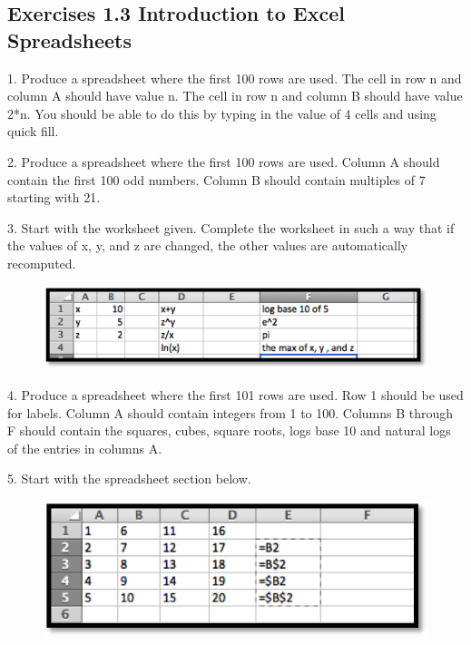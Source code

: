 \documentclass[10pt,]{book}
\theoremstyle{plain}
\theoremstyle{definition}
\theoremstyle{definition}
\begin{document}
\subsection[{Exercises 1.3 Introduction to Excel Spreadsheets}]{Exercises 1.3 Introduction to Excel Spreadsheets}\label{exercises-set-sec-1-3}
\begin{exerciselist}
\item[1.]\hypertarget{exercise-42}{}  Produce a spreadsheet where the first 100 rows are used.  The cell in row n and column A should have value n.  The cell in row n and column B should have value 2*n.  You should be able to do this by typing in the value of 4 cells and using quick fill.
%
\par\smallskip
\item[2.]\hypertarget{exercise-43}{}  Produce a spreadsheet where the first 100 rows are used.  Column A should contain the first 100 odd numbers.  Column B should contain multiples of 7 starting with 21.
%
\par\smallskip
\item[3.]\hypertarget{exercise-44}{}  Start with the worksheet given.  Complete the worksheet in such a way that if the values of x, y, and z are changed, the other values are automatically recomputed.
%
\par\smallskip
\leavevmode%
\begin{figure}
\centering
\includegraphics[width=0.7\linewidth]{images/sec1-3-e1.png}
\end{figure}
\item[4.]\hypertarget{exercise-45}{}  Produce a spreadsheet where the first 101 rows are used.  Row 1 should be used for labels. Column A should contain integers from 1 to 100.  Columns B through F should contain the squares, cubes, square roots, logs base 10 and natural logs of the entries in columns A.
%
\par\smallskip
\item[5.]\hypertarget{exercise-46}{}  Start with the spreadsheet section below.
\leavevmode%
\begin{figure}
\centering
\includegraphics[width=0.6\linewidth]{images/sec1-3-e2.png}
\end{figure}
 

\end{exerciselist}
\end{document}
